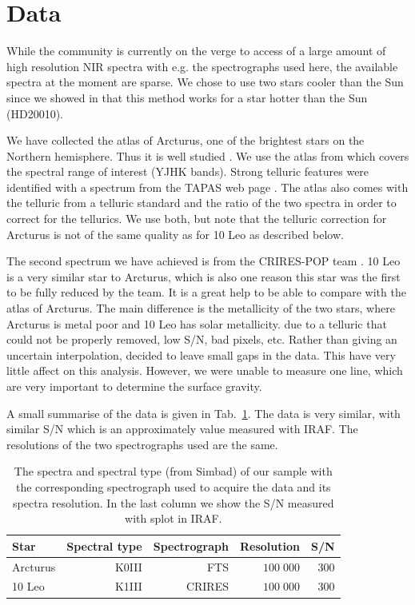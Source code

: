 \documentclass{aa}
\begin{document}
\section{Data}
\label{sec:data}

While the community is currently on the verge to access of a large amount of
high resolution NIR spectra with e.g. the spectrographs used here, the available
spectra at the moment are sparse. We chose to use two stars cooler than the Sun
since we showed in \citet{Andreasen2016} that this method works for a star
hotter than the Sun (HD20010).

We have collected the atlas of Arcturus, one of the brightest stars on the
Northern hemisphere. Thus it is well studied
\citep[see e.g.][to mention a few]{Griffin1967,McWilliam1990,Ramirez2013}. We
use the atlas from \cite{Hinkle2003} which covers the spectral range of interest
(YJHK bands). Strong telluric features were identified with a spectrum from the
TAPAS web page \citep{Bertaux2014}. The atlas also comes with the telluric from
a telluric standard and the ratio of the two spectra in order to correct for the
tellurics. We use both, but note that the telluric correction for Arcturus is
not of the same quality as for 10 Leo as described below.

The second spectrum we have achieved is from the CRIRES-POP team
\citep{Nicholls2016}. 10 Leo is a very similar star to Arcturus, which is also
one reason this star was the first to be fully reduced by the team. It is a
great help to be able to compare with the atlas of Arcturus. The main difference
is the metallicity of the two stars, where Arcturus is metal poor and 10 Leo has
solar metallicity. due to a telluric that could not be properly removed, low
S/N, bad pixels, etc. Rather than giving an uncertain interpolation,
\citet{Nicholls2016} decided to leave small gaps in the data. This have very
little affect on this analysis. However, we were unable to measure one
 line, which are very important to determine the surface gravity.

A small summarise of the data is given in Tab.~\ref{tab:data}. The data is very
similar, with similar S/N which is an approximately value measured with IRAF.
The resolutions of the two spectrographs used are the same.


\begin{table}[htb!]
    \caption{The spectra and spectral type (from Simbad) of our sample with
             the corresponding spectrograph used to acquire the data and its
             spectra resolution. In the last column we show the S/N measured
             with splot in IRAF.}
    \label{tab:data}
    \centering
    \begin{tabular}{lrrrr}
      \hline\hline
        Star      & Spectral type & Spectrograph  & Resolution   &  S/N  \\
      \hline
        Arcturus  &      K0III    & FTS           &  $100\;000$  &  300  \\
        10 Leo    &      K1III    & CRIRES        &  $100\;000$  &  300
    \end{tabular}
\end{table}
\end{document}
